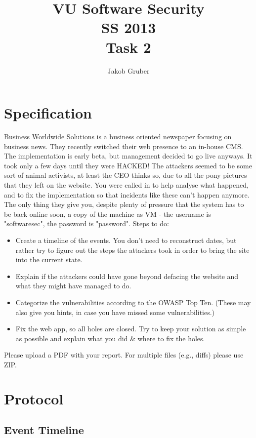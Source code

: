\documentclass[a4paper,10pt]{article}
\title{VU Software Security \\
       SS 2013 \\
       Task 2}
\author{Jakob Gruber}
\begin{document}
\maketitle

\section{Specification}

Business Worldwide Solutions is a business oriented newspaper focusing on
business news. They recently switched their web presence to an in-house CMS.
The implementation is early beta, but management decided to go live anyways. It
took only a few days until they were HACKED! The attackers seemed to be some
sort of animal activists, at least the CEO thinks so, due to all the pony
pictures that they left on the website. You were called in to help analyse what
happened, and to fix the implementation so that incidents like these can't
happen anymore. The only thing they give you, despite plenty of pressure that
the system has to be back online soon, a copy of the machine as VM - the
username is "softwaresec", the password is "password". Steps to do:

\begin{itemize}
\item Create a timeline of the events. You don't need to reconstruct dates, but
  rather try to figure out the steps the attackers took in order to bring the
  site into the current state. 
\item Explain if the attackers could have gone beyond defacing the website and what
  they might have managed to do. 
\item Categorize the vulnerabilities according to the OWASP Top Ten. (These may
  also give you hints, in case you have missed some vulnerabilities.) 
\item Fix the web app, so all holes are closed. Try to keep your solution as simple
  as possible and explain what you did \& where to fix the holes.
\end{itemize}

Please upload a PDF with your report. For multiple files (e.g., diffs) please
use ZIP. 

\section{Protocol}

\subsection{Event Timeline}
\end{document}
